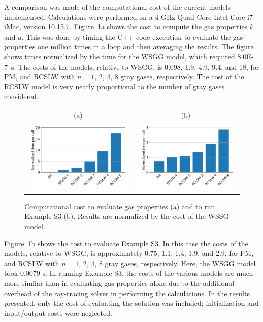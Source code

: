 \documentclass[preprint,12pt]{elsarticle}
\begin{document}
A comparison was made of the computational cost of the current models implemented. Calculations were performed on a 4 GHz Quad Core Intel Core i7 iMac, version 10.15.7. Figure~\ref{f:cost}a shows the cost to compute the gas properties $k$ and $a$. This was done by timing the C++ code execution to evaluate the gas properties one million times in a loop and then averaging the results. The figure shows times normalized by the time for the WSGG model, which required 8.0E-7~s. The costs of the models, relative to WSGG, is 0.098, 1.9, 4.9, 9.4, and 18, for PM, and RCSLW with $n=1$, 2, 4, 8 gray gases, respectively. The cost of the RCSLW model is very nearly proportional to the number of gray gases considered.
%
\begin{figure}
    \begin{center}
    \begin{tabular}{c c}
        (a) & (b) \\
        \includegraphics[width=2.75 in]{fig_getka_c++.pdf} &
        \includegraphics[width=2.75 in]{fig_exS3_c++.pdf}
    \end{tabular}
    \caption{Computational cost to evaluate gas properties (a) and to run Example S3 (b). Results are normalized by the cost of the WSSG model.}
    \label{f:cost}
    \end{center}
\end{figure}
%

Figure~\ref{f:cost}b shows the cost to evaluate Example S3. 
In this case the costs of the models, relative to WSGG, is approximately 0.75, 1.1, 1.4, 1.9, and 2.9, for PM, and RCSLW with $n=1$, 2, 4, 8 gray gases, respectively. Here, the WSGG model took 0.0079 s. In running Example S3, the costs of the various models are much more similar than in evaluating gas properties alone due to the additional overhead of the ray-tracing solver in performing the calculations. In the results presented, only the cost of evaluating the solution was included; initialization and input/output costs were neglected.
\end{document}
